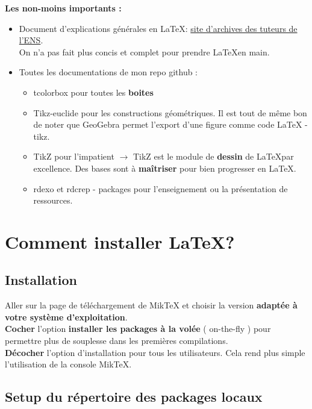 \documentclass[a4paper,11pt,fleqn]{article}
\newcommand{\vocref}[2]{\href{#1}{\color{monrose}#2}}
\begin{document}
\textbf{Les non-moins importants :}\\

\begin{itemize}[label=\bccrayon]

	\item Document d'explications générales en \LaTeX : \vocref{https://tuteurs.ens.fr/logiciels/latex/}{site d'archives des tuteurs de l'ENS}.\\On n'a pas fait plus concis et complet pour prendre \LaTeX en main.
	\item Toutes les documentations de mon repo github : \\
		\begin{itemize}[label=\faPen]
			\item tcolorbox pour toutes les \textbf{boites} 
			\item Tikz-euclide pour les constructions géométriques. Il est tout de même bon de noter que GeoGebra permet l'export d'une figure comme code LaTeX - tikz.
			\item TikZ pour l'impatient $\longrightarrow$ TikZ est le module de \textbf{dessin} de \LaTeX par excellence. Des bases sont à \textbf{maîtriser} pour bien progresser en \LaTeX. 
			\item rdexo et rdcrep - packages pour l'enseignement ou la présentation de ressources. 
		\end{itemize}
	
\end{itemize}	

\section{Comment installer \LaTeX ?}

\subsection{Installation}

Aller sur la page de téléchargement de MikTeX et choisir la version \textbf{adaptée à votre système d'exploitation}.\\
\textbf{Cocher} l'option \textbf{installer les packages à la volée} ( on-the-fly ) pour permettre plus de souplesse dans les premières compilations.\\
\textbf{Décocher} l'option d'installation pour tous les utilisateurs. Cela rend plus simple l'utilisation de la console MikTeX.


\subsection{Setup du répertoire des packages locaux}
\end{document}
